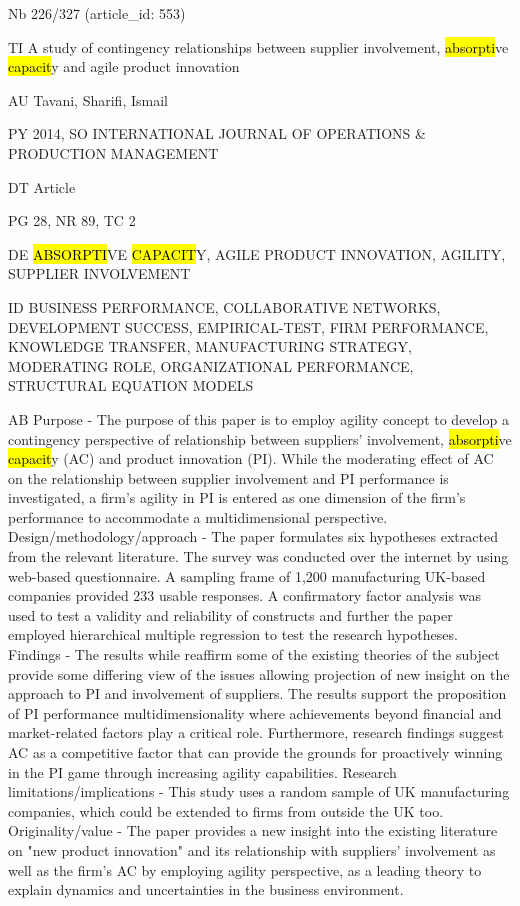 \documentclass[a4paper]{article}
\begin{document}
\vspace*{-2cm}
Nb \tabto{0cm}226/327 (article\_id: 553)\par
TI \tabto{0cm}A study of contingency relationships between supplier involvement, \hl{absorpti}ve \hl{capacit}y and agile product innovation\par
AU \tabto{0cm}Tavani, Sharifi, Ismail\par
PY \tabto{0cm}2014, SO INTERNATIONAL JOURNAL OF OPERATIONS \& PRODUCTION MANAGEMENT\par
DT \tabto{0cm}Article\par
PG \tabto{0cm}28, NR 89, TC 2\par
DE \tabto{0cm}\hl{ABSORPTI}VE \hl{CAPACIT}Y, AGILE PRODUCT INNOVATION, AGILITY, SUPPLIER INVOLVEMENT\par
ID \tabto{0cm}BUSINESS PERFORMANCE, COLLABORATIVE NETWORKS, DEVELOPMENT SUCCESS, EMPIRICAL-TEST, FIRM PERFORMANCE, KNOWLEDGE TRANSFER, MANUFACTURING STRATEGY, MODERATING ROLE, ORGANIZATIONAL PERFORMANCE, STRUCTURAL EQUATION MODELS\par
AB \tabto{0cm}Purpose - The purpose of this paper is to employ agility concept to develop a contingency perspective of relationship between suppliers' involvement, \hl{absorpti}ve \hl{capacit}y (AC) and product innovation (PI). While the moderating effect of AC on the relationship between supplier involvement and PI performance is investigated, a firm's agility in PI is entered as one dimension of the firm's performance to accommodate a multidimensional perspective.
Design/methodology/approach - The paper formulates six hypotheses extracted from the relevant literature. The survey was conducted over the internet by using web-based questionnaire. A sampling frame of 1,200 manufacturing UK-based companies provided 233 usable responses. A confirmatory factor analysis was used to test a validity and reliability of constructs and further the paper employed hierarchical multiple regression to test the research hypotheses.
Findings - The results while reaffirm some of the existing theories of the subject provide some differing view of the issues allowing projection of new insight on the approach to PI and involvement of suppliers. The results support the proposition of PI performance multidimensionality where achievements beyond financial and market-related factors play a critical role. Furthermore, research findings suggest AC as a competitive factor that can provide the grounds for proactively winning in the PI game through increasing agility capabilities.
Research limitations/implications - This study uses a random sample of UK manufacturing companies, which could be extended to firms from outside the UK too.
Originality/value - The paper provides a new insight into the existing literature on "new product innovation" and its relationship with suppliers' involvement as well as the firm's AC by employing agility perspective, as a leading theory to explain dynamics and uncertainties in the business environment.\par
\clearpage
\end{document}
